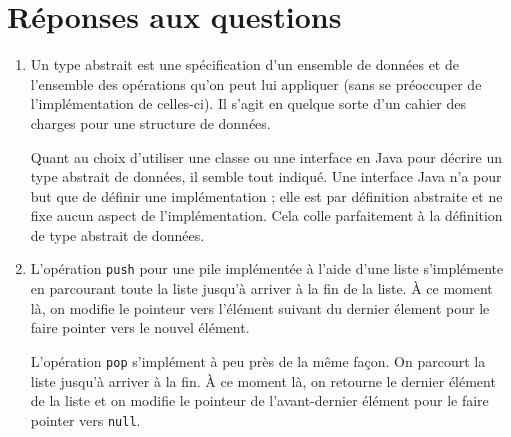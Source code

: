 

\section{Réponses aux questions}
\begin{enumerate}
	\item Un type abstrait est une spécification
	d'un ensemble de données et de l'ensemble des
	opérations qu'on peut lui appliquer (sans se
	préoccuper de l'implémentation de celles-ci).
	Il s'agit en quelque sorte d'un cahier des
	charges pour une structure de données.
	\cite{wiki-tad}\cite{mod-obj}
	
	Quant au choix d'utiliser une classe ou une
	interface en Java pour décrire un type abstrait
	de données, il semble tout indiqué. Une interface
	Java n'a pour but que de définir une implémentation ;
	elle est par définition abstraite et ne fixe aucun
	aspect de l'implémentation.\cite{nino} Cela colle
	parfaitement à la définition de type abstrait de
	données.
	\item L'opération \lstinline{push}\lstinline{} pour une pile
	implémentée à l'aide d'une liste s'implémente en
	parcourant toute la liste jusqu'à arriver à la fin
	de la liste. \`{A} ce moment là, on modifie le
	pointeur vers l'élément suivant du dernier élement
	pour le faire pointer vers le nouvel élément.
	
	L'opération \lstinline{pop}\lstinline{} s'implément à peu près
	de la même façon. On parcourt la liste jusqu'à
	arriver à la fin. \`{A} ce moment là, on retourne
	le dernier élément de la liste et on modifie le
	pointeur de l'avant-dernier élément pour le faire
	pointer vers \lstinline{null}\lstinline{}.
	

\end{enumerate}
